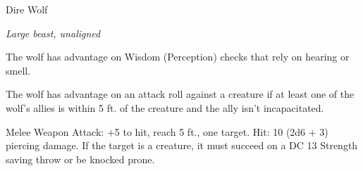 \begin{monsterbox}{Dire Wolf}
\begin{hangingpar}
\textit{Large beast, unaligned}
\end{hangingpar}
\dndline%
\basics[%
armorclass = 14,
hitpoints = 5d10 + 10,
speed = {50 ft.}
]
\dndline%
\stats[%
STR = \stat{17},
DEX = \stat{15},
CON = \stat{15},
INT = \stat{3},
WIS = \stat{12},
CHA = \stat{7}
]
\dndline%
\details[%
skills={Stealth +4, Perception +3, },
damageimmunities={},
savingthrows={},
conditionimmunities={},
damageresistances={},
damagevulnerabilities={},
senses={passive Perception 13},
challenge=1
]
\dndline%
\begin{monsteraction}
The wolf has advantage on Wisdom (Perception) checks that rely on hearing or smell.
\end{monsteraction}
\begin{monsteraction}
The wolf has advantage on an attack roll against a creature if at least one of the wolf's allies is within 5 ft. of the creature and the ally isn't incapacitated.
\end{monsteraction}
\begin{monsteraction}[Bite]
Melee Weapon Attack: +5 to hit, reach 5 ft., one target. Hit: 10 (2d6 + 3) piercing damage. If the target is a creature, it must succeed on a DC 13 Strength saving throw or be knocked prone.
\end{monsteraction}
\end{monsterbox}